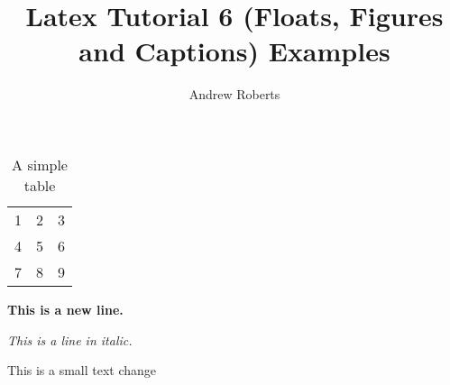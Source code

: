 \documentclass[english]{article}
\begin{document}
\title{Latex Tutorial 6 (Floats, Figures and Captions) Examples}
\author{Andrew Roberts}
\maketitle

\begin{table}[htp]
  \begin{center}
    \begin{tabular}{| l c r |}
    \hline
    1 & 2 & 3 \\
    4 & 5 & 6 \\
    7 & 8 & 9 \\
    \hline
    \end{tabular}
  \end{center}
  \caption{A simple table}
\end{table}

\textbf{This is a new line.}

\textit{This is a line in italic.}

This is a small text change
\end{document}
